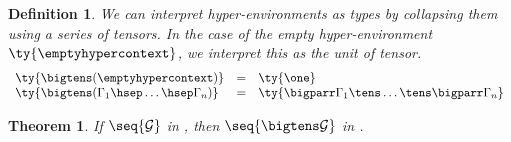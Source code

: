 \documentclass[submission,copyright,creativecommons]{eptcs}
\newtheorem{definition}{Definition}
\newtheorem{theorem}{Theorem}
\begin{document}
\begin{definition}\label{def:hcp-bigtens}
  We can interpret hyper-environments as types by collapsing them using a series
  of tensors. In the case of the empty hyper-environment
  $\ty{\emptyhypercontext}$, we interpret this as the unit of tensor.
  \begin{gather*}
    \begin{array}{lcl}
      \ty{\bigtens(\emptyhypercontext)}
      & = & \ty{\one}
      \\
      \ty{\bigtens(\Gamma_1 \hsep \dots \hsep \Gamma_n)}
      & = & \ty{\bigparr\Gamma_1 \tens \dots \tens \bigparr\Gamma_n}
    \end{array}
  \end{gather*}
\end{definition}

\begin{theorem}\label{thm:hcp2cp-bigtens}
  If $\seq{\mathcal{G}}$ in \hcp, then $\seq{\bigtens\mathcal{G}}$ in \cp.
\end{theorem}




\end{document}
